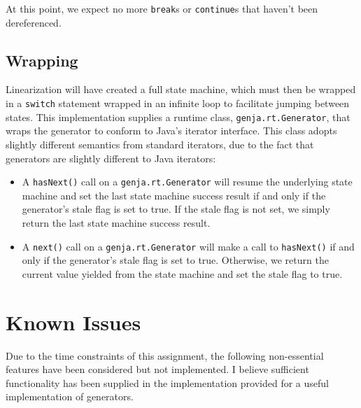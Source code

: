 \documentclass[journal,a4paper]{IEEEtran}
\begin{document}
At this point, we expect no more \texttt{break}s or \texttt{continue}s that haven't been
dereferenced.

\subsection{Wrapping}

Linearization will have created a full state machine, which must then be wrapped in a
\texttt{switch} statement wrapped in an infinite loop to facilitate jumping between states. This
implementation supplies a runtime class, \texttt{genja.rt.Generator}, that wraps the generator to
conform to Java's iterator interface. This class adopts slightly different semantics from standard
iterators, due to the fact that generators are slightly different to Java iterators:

\begin{itemize}
\item A \texttt{hasNext()} call on a \texttt{genja.rt.Generator} will resume the underlying state
machine and set the last state machine success result if and only if the generator's stale flag is
set to true. If the stale flag is not set, we simply return the last state machine success result.

\item A \texttt{next()} call on a \texttt{genja.rt.Generator} will make a call to
\texttt{hasNext()} if and only if the generator's stale flag is set to true. Otherwise, we return
the current value yielded from the state machine and set the stale flag to true.
\end{itemize}

\section{Known Issues}

Due to the time constraints of this assignment, the following non-essential features have been
considered but not implemented. I believe sufficient functionality has been supplied in the
implementation provided for a useful implementation of generators.
\end{document}
